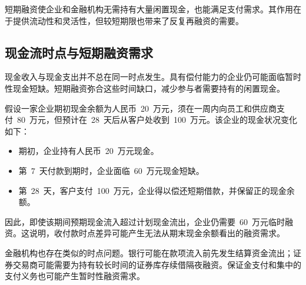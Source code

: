 短期融资使企业和金融机构无需持有大量闲置现金，也能满足支付需求。其作用在于提供流动性和灵活性，但较短期限也带来了反复再融资的需要。

\subsection{现金流时点与短期融资需求}

现金收入与现金支出并不总在同一时点发生。具有偿付能力的企业仍可能面临暂时性现金短缺。短期融资弥合这些时间缺口，减少参与者需要持有的闲置现金。

假设一家企业期初现金余额为人民币~20~万元，须在一周内向员工和供应商支付~80~万元，但预计在~28~天后从客户处收到~100~万元。该企业的现金状况变化如下：

\begin{itemize}
\item 期初，企业持有人民币~20~万元现金。

\item 第~7~天付款到期时，企业面临~60~万元现金短缺。

\item 第~28~天，客户支付~100~万元，企业得以偿还短期借款，并保留正的现金余额。
\end{itemize}

因此，即使该期间预期现金流入超过计划现金流出，企业仍需要~60~万元临时融资。这说明，收付款时点差异可能产生无法从期末现金余额看出的融资需求。

金融机构也存在类似的时点问题。银行可能在款项流入前先发生结算资金流出；证券交易商可能需要为持有较长时间的证券库存续借隔夜融资。保证金支付和集中的支付义务也可能产生暂时性融资需求。


